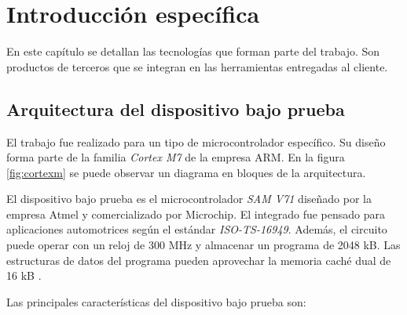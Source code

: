 \chapter{Introducción específica}

\label{Chapter2}

En este capítulo se detallan las tecnologías que forman parte del trabajo.
Son productos de terceros que se integran en las herramientas entregadas al cliente.

\section{Arquitectura del dispositivo bajo prueba}
\label{sec:dut}

El trabajo fue realizado para un tipo de microcontrolador específico.
Su diseño forma parte de la familia \emph{Cortex M7} de la empresa ARM.
En la figura \ref{fig:cortexm} se puede observar un diagrama en bloques de la arquitectura.

El dispositivo bajo prueba es el microcontrolador \emph{SAM V71} diseñado por la empresa Atmel y comercializado por Microchip.
El integrado fue pensado para aplicaciones automotrices según el estándar \emph{ISO-TS-16949}.
Además, el circuito puede operar con un reloj de 300 MHz y almacenar un programa de 2048 kB.
Las estructuras de datos del programa pueden aprovechar la memoria caché dual de 16 kB \citep{ARTICLE:dutdatasheet}.

Las principales características del dispositivo bajo prueba son:

